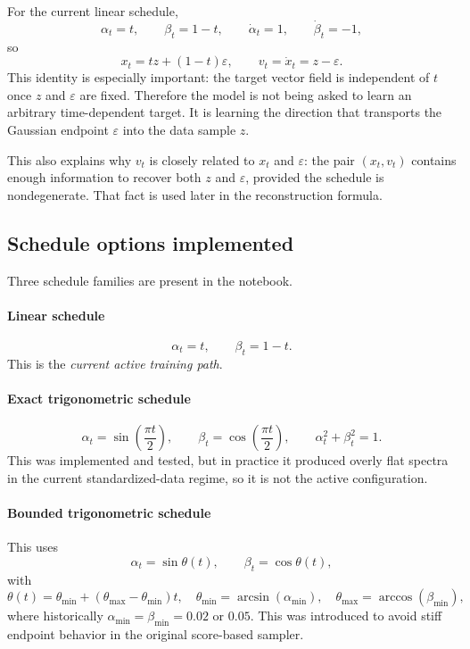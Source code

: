 \documentclass[11pt]{article}
\newcommand{\e}{\varepsilon}
\begin{document}
For the current linear schedule,
\begin{equation}
  \alpha_t=t,
  \qquad
  \beta_t=1-t,
  \qquad
  \dot\alpha_t = 1,
  \qquad
  \dot\beta_t = -1,
\end{equation}
so
\begin{equation}
  x_t = t z + (1-t)\e,
  \qquad
  v_t = \dot x_t = z-\e.
\end{equation}
This identity is especially important: the target vector field is independent of \(t\) once \(z\) and \(\e\) are fixed. Therefore the model is not being asked to learn an arbitrary time-dependent target. It is learning the direction that transports the Gaussian endpoint \(\e\) into the data sample \(z\).

This also explains why \(v_t\) is closely related to \(x_t\) and \(\e\): the pair \((x_t,v_t)\) contains enough information to recover both \(z\) and \(\e\), provided the schedule is nondegenerate. That fact is used later in the reconstruction formula.

\subsection{Schedule options implemented}

Three schedule families are present in the notebook.

\paragraph{Linear schedule}
\begin{equation}
  \alpha_t = t,
  \qquad
  \beta_t = 1-t.
\end{equation}
This is the \emph{current active training path}.

\paragraph{Exact trigonometric schedule}
\begin{equation}
  \alpha_t = \sin\!\left(\frac{\pi t}{2}\right),
  \qquad
  \beta_t = \cos\!\left(\frac{\pi t}{2}\right),
  \qquad
  \alpha_t^2+\beta_t^2=1.
\end{equation}
This was implemented and tested, but in practice it produced overly flat spectra in the current standardized-data regime, so it is not the active configuration.

\paragraph{Bounded trigonometric schedule}
This uses
\begin{equation}
  \alpha_t = \sin \theta(t),
  \qquad
  \beta_t = \cos \theta(t),
\end{equation}
with
\begin{equation}
  \theta(t)=\theta_{\min}+(\theta_{\max}-\theta_{\min})t,
  \quad
  \theta_{\min}=\arcsin(\alpha_{\min}),
  \quad
  \theta_{\max}=\arccos(\beta_{\min}),
\end{equation}
where historically \(\alpha_{\min}=\beta_{\min}=0.02\) or \(0.05\).
This was introduced to avoid stiff endpoint behavior in the original score-based sampler.
\end{document}
